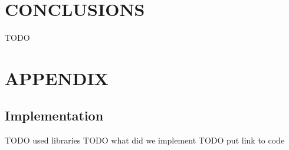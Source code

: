 \documentclass[letterpaper, 10 pt, conference]{ieeeconf}  %
\begin{document}
\section{CONCLUSIONS}
\label{sec:concl}
TODO

\addtolength{\textheight}{-12cm}   %







\section*{APPENDIX}
\label{sec:appendix}
\subsection{Implementation}
TODO used libraries
TODO what did we implement
TODO put link to code
\end{document}

